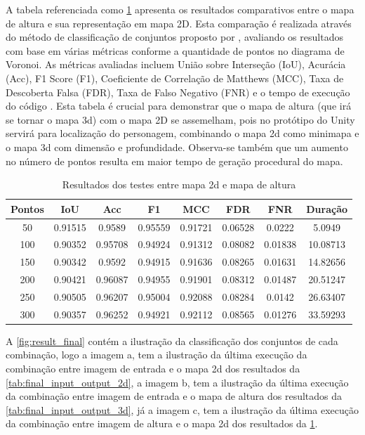 A tabela referenciada como \cref{tab:final_output_2d_output_3d} apresenta os resultados comparativos entre o mapa de altura e sua representação em mapa 2D. Esta comparação é realizada através do método de classificação de conjuntos proposto por \cite{kirillov2019panoptic}, avaliando os resultados com base em várias métricas conforme a quantidade de pontos no diagrama de Voronoi. As métricas avaliadas incluem União sobre Interseção (IoU), Acurácia (Acc), F1 Score (F1), Coeficiente de Correlação de Matthews (MCC), Taxa de Descoberta Falsa (FDR), Taxa de Falso Negativo (FNR) e o tempo de execução do código \cite{Chicco2020, confusion_matrix_calculator, iou_metric_link}. Esta tabela é crucial para demonstrar que o mapa de altura (que irá se tornar o mapa 3d) com o mapa 2D se assemelham, pois no protótipo do Unity servirá para localização do personagem, combinando o mapa 2d como minimapa e o mapa 3d com dimensão e profundidade. Observa-se também que um aumento no número de pontos resulta em maior tempo de geração procedural do mapa.

\begin{table}[h]
	\centering
	\caption{Resultados dos testes entre mapa 2d e mapa de altura}
	\label{tab:final_output_2d_output_3d}
	\begin{tabular}{|c|c|c|c|c|c|c|c|}
		\hline
						Pontos & IoU & Acc & F1 & MCC & FDR & FNR & Duração \\
		\hline
		50 & 0.91515 & 0.9589 & 0.95559 & 0.91721 & 0.06528 & 0.0222 & 5.0949\\
100 & 0.90352 & 0.95708 & 0.94924 & 0.91312 & 0.08082 & 0.01838 & 10.08713\\
150 & 0.90342 & 0.9592 & 0.94915 & 0.91636 & 0.08265 & 0.01631 & 14.82656\\
200 & 0.90421 & 0.96087 & 0.94955 & 0.91901 & 0.08312 & 0.01487 & 20.51247\\
250 & 0.90505 & 0.96207 & 0.95004 & 0.92088 & 0.08284 & 0.0142 & 26.63407\\
300 & 0.90357 & 0.96252 & 0.94921 & 0.92112 & 0.08565 & 0.01276 & 33.59293\\
		\hline
	\end{tabular}
\end{table}

A \cref{fig:result_final} contém a ilustração da classificação dos conjuntos de cada combinação, logo a imagem a, tem a ilustração da última execução da combinação entre imagem de entrada e o mapa 2d dos resultados da \cref{tab:final_input_output_2d}, a imagem b, tem a ilustração da última execução da combinação entre imagem de entrada e o mapa de altura dos resultados da \cref{tab:final_input_output_3d}, já a imagem c, tem a ilustração da última execução da combinação entre imagem de altura e o mapa 2d dos resultados da \cref{tab:final_output_2d_output_3d}.

